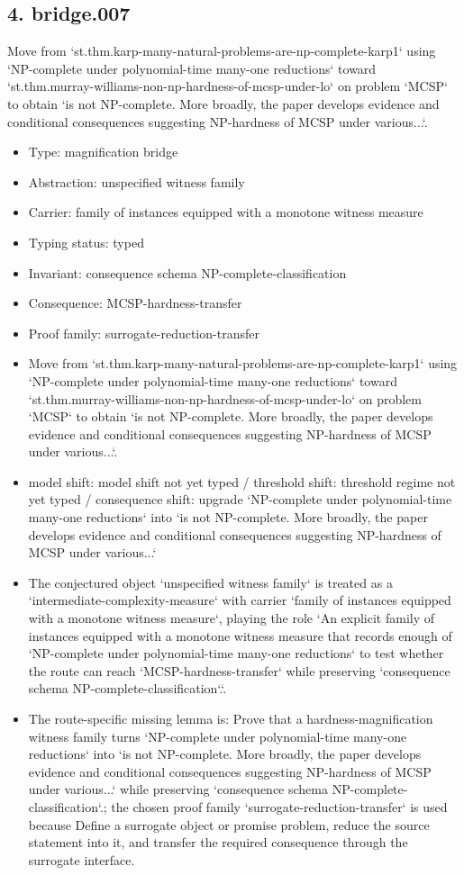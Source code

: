 \documentclass[11pt]{article}
\begin{document}
\subsection*{4. bridge.007}
Move from `st.thm.karp-many-natural-problems-are-np-complete-karp1` using `NP-complete under polynomial-time many-one reductions` toward `st.thm.murray-williams-non-np-hardness-of-mcsp-under-lo` on problem `MCSP` to obtain `is not NP-complete. More broadly, the paper develops evidence and conditional consequences suggesting NP-hardness of MCSP under various...`.
\begin{itemize}
\item Type: magnification bridge
\item Abstraction: unspecified witness family
\item Carrier: family of instances equipped with a monotone witness measure
\item Typing status: typed
\item Invariant: consequence schema NP-complete-classification
\item Consequence: MCSP-hardness-transfer
\item Proof family: surrogate-reduction-transfer
\item Move from `st.thm.karp-many-natural-problems-are-np-complete-karp1` using `NP-complete under polynomial-time many-one reductions` toward `st.thm.murray-williams-non-np-hardness-of-mcsp-under-lo` on problem `MCSP` to obtain `is not NP-complete. More broadly, the paper develops evidence and conditional consequences suggesting NP-hardness of MCSP under various...`.
\item model shift: model shift not yet typed / threshold shift: threshold regime not yet typed / consequence shift: upgrade `NP-complete under polynomial-time many-one reductions` into `is not NP-complete. More broadly, the paper develops evidence and conditional consequences suggesting NP-hardness of MCSP under various...`
\item The conjectured object `unspecified witness family` is treated as a `intermediate-complexity-measure` with carrier `family of instances equipped with a monotone witness measure`, playing the role `An explicit family of instances equipped with a monotone witness measure that records enough of `NP-complete under polynomial-time many-one reductions` to test whether the route can reach `MCSP-hardness-transfer` while preserving `consequence schema NP-complete-classification`.`.
\item The route-specific missing lemma is: Prove that a hardness-magnification witness family turns `NP-complete under polynomial-time many-one reductions` into `is not NP-complete. More broadly, the paper develops evidence and conditional consequences suggesting NP-hardness of MCSP under various...` while preserving `consequence schema NP-complete-classification`.; the chosen proof family `surrogate-reduction-transfer` is used because Define a surrogate object or promise problem, reduce the source statement into it, and transfer the required consequence through the surrogate interface.

\end{itemize}
\end{document}
